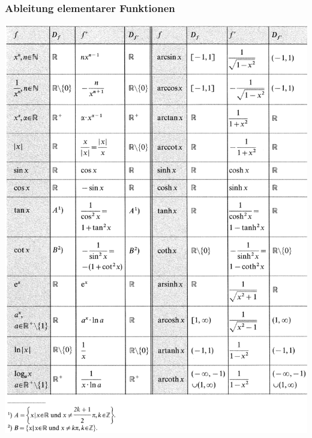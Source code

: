 \subsubsection{Ableitung elementarer Funktionen}
\includegraphics[width=\columnwidth]{images/V0B0.png}